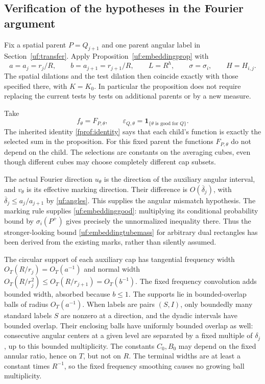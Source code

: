 \subsection*{Verification of the hypotheses in the Fourier argument}

Fix a spatial parent \(P=Q_{j+1}\) and one parent angular label in
Section~\ref{uf:transfer}. Apply Proposition~\ref{uf:embeddingprop}
with
$$
 a=a_j=r_j/R,\qquad b=a_{j+1}=r_{j+1}/R,\qquad
 L=R^h,\qquad \sigma=\sigma_i,\qquad H=H_{i,j}.
$$
The spatial dilations and the test dilation then coincide exactly with
those specified there, with \(K=K_0\). In particular the proposition
does not require replacing the current tests by tests on additional
parents or by a new measure.

Take
$$
 f_\theta=F_{P,\theta},\qquad
 \varepsilon_{Q,\theta}=
    \mathbf 1_{\{\theta\text{ is good for }Q\}}.
$$
The inherited identity \eqref{fprof:identity} says that each child's
function is exactly the selected sum in the proposition. For this
fixed parent the functions \(F_{P,\theta}\) do not depend on the
child. The selections are constants on the averaging cubes, even
though different cubes may choose completely different cap subsets.

The actual Fourier direction \(u_\theta\) is the direction of the
auxiliary angular interval, and \(v_\theta\) is its effective marking
direction. Their difference is \(O(\overline\delta_j)\), with
\(\overline\delta_j\leq a_j/a_{j+1}\) by
\eqref{uf:angles}. This supplies the angular mismatch hypothesis.
The marking rule supplies \eqref{uf:embeddinggood}: multiplying its
conditional probability bound by \(\sigma_i(P^+)\) gives precisely
the unnormalized inequality there. Thus the stronger-looking bound
\eqref{uf:embeddingtubemass} for arbitrary dual rectangles has been
derived from the existing marks, rather than silently assumed.

The circular support of each auxiliary cap has tangential frequency
width \(O_T(R/r_j)=O_T(a^{-1})\) and normal width
\(O_T(R/r_j^2)\leq O_T(R/r_{j+1})=O_T(b^{-1})\).
The fixed frequency convolution adds bounded width, absorbed because
\(b\leq1\). The supports lie in bounded-overlap balls of radius
\(O_T(a^{-1})\). When labels are pairs \((S,I)\), only boundedly
many standard labels \(S\) are nonzero at a direction, and the
dyadic intervals have bounded overlap. Their enclosing balls have
uniformly bounded overlap as well: consecutive angular centers at a
given level are separated by a fixed multiple of \(\delta_j\),
up to this bounded multiplicity. The constants \(C_0,B_0\) may
depend on the fixed annular ratio, hence on \(T\), but not on \(R\).
The terminal widths are at least a constant times \(R^{-1}\), so
the fixed frequency smoothing causes no growing ball multiplicity.

